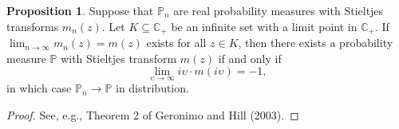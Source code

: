 \documentclass[a4paper,11pt]{book}
\theoremstyle{plain}
\theoremstyle{definition}
\newtheorem{prps}[thm]{Proposition}
\newcommand{\MP}{\mathbb{P}}
\begin{document}
    \begin{prps} \label{prps 6}
    	Suppose that $\mathbb{P}_n$ are real probability measures with Stieltjes transforms $m_n(z)$. Let $K \subseteq \mathbb{C}_+$ be an infinite set with a limit point in $\mathbb{C}_+$. If $\lim_{n \rightarrow \infty} m_n(z) = m(z)$ exists for all $z \in K$, then there exists a probability measure $\MP$ with Stieltjes transform $m(z)$ if and only if
    	\begin{equation} \label{prps 6 eq}
    		\lim_{\upsilon \rightarrow \infty} i\upsilon \cdot m(i \upsilon) = -1,
    	\end{equation}
    	in which case $\MP_n \rightarrow \MP$ in distribution.
    \end{prps}
    \begin{proof}
    	See, e.g., Theorem 2 of Geronimo and Hill (2003).
    \end{proof}
    
\end{document}
